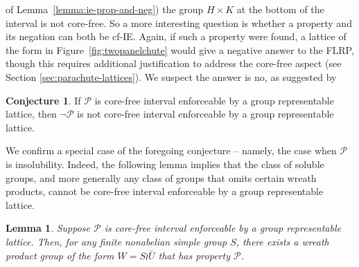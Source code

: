 \documentclass[11pt]{amsart}
\theoremstyle{plain}
\newtheorem{lemma}[theorem]{Lemma}
\theoremstyle{definition}
\newcounter{conjecture}
\newtheorem{conjecture}[conjecture]{Conjecture}
\theoremstyle{remark}
\numberwithin{theorem}{section}
\numberwithin{claim}{section}
\numberwithin{equation}{section}
\numberwithin{conjecture}{section}
\newcommand{\<}{\ensuremath{\langle}}
\renewcommand{\>}{\ensuremath{\rangle}}
\newcommand{\FLRP}{{\small FLRP}}
\newcommand{\0}{\ensuremath{\mathbf{0}}}
\newcommand{\1}{\ensuremath{\mathbf{1}}}
\newcommand{\2}{\ensuremath{\mathbf{2}}}
\newcommand{\3}{\ensuremath{\mathbf{3}}}
\newcommand{\4}{\ensuremath{\mathbf{4}}}
\newcommand{\5}{\ensuremath{\mathbf{5}}}
\newcommand{\cP}{\ensuremath{\mathcal{P}}}
\newcommand{\IE}{{\small IE}}
\begin{document}
of Lemma~\ref{lemma:ie-prop-and-neg}) the group $H\times K$ at the bottom of
the interval is not core-free.  So a more interesting question is whether a
property and its negation can both be cf-\IE.  Again, if such a property were
found, a lattice of the form in Figure~\ref{fig:twopanelchute} would give a
negative answer to the \FLRP, though this requires additional justification to address
the core-free aspect (see Section \ref{sec:parachute-lattices}).  
We suspect the answer is no, as suggested by
\begin{conjecture}
\label{conjecture:isle-prop2}
If $\cP$ is core-free interval enforceable by a group representable lattice,
then $\neg \cP$ is not core-free interval enforceable by a group representable lattice.
\end{conjecture}

We confirm a special case of the foregoing conjecture -- namely, the case when
$\cP$ is insolubility. Indeed, the following lemma implies that the class of
soluble groups, and more generally any class of groups that omits certain wreath
products, cannot be core-free interval enforceable by a group representable lattice.
\begin{lemma}
  \label{lem:IE-must-have-wreaths}
Suppose $\cP$ is core-free interval enforceable by a group
representable lattice.   
Then, for any finite nonabelian simple group $S$, there exists a wreath product group
of the form $W = S\wr \bar{U}$ that has property $\cP$.
\end{lemma}
\end{document}
